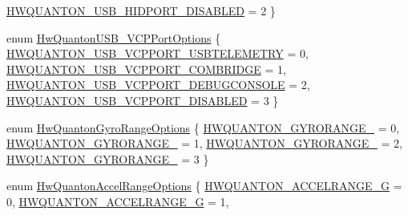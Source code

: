 \begin{DoxyCompactItemize}
\hyperlink{group___hw_quanton_gga6032651edd94cb4e24e1b333c8ea7e64add2cedb1058de19b9363bdf7945debe4}{\-H\-W\-Q\-U\-A\-N\-T\-O\-N\-\_\-\-U\-S\-B\-\_\-\-H\-I\-D\-P\-O\-R\-T\-\_\-\-D\-I\-S\-A\-B\-L\-E\-D} = 2
 \}
\item 
enum \hyperlink{group___hw_quanton_ga05782d1a399ec1fbbc22b0953b1e6907}{\-Hw\-Quanton\-U\-S\-B\-\_\-\-V\-C\-P\-Port\-Options} \{ \hyperlink{group___hw_quanton_gga05782d1a399ec1fbbc22b0953b1e6907acdd9d7e986b523669b41605c0aaefb8a}{\-H\-W\-Q\-U\-A\-N\-T\-O\-N\-\_\-\-U\-S\-B\-\_\-\-V\-C\-P\-P\-O\-R\-T\-\_\-\-U\-S\-B\-T\-E\-L\-E\-M\-E\-T\-R\-Y} = 0, 
\hyperlink{group___hw_quanton_gga05782d1a399ec1fbbc22b0953b1e6907af5abd6567dde92ff1171216f05372cd1}{\-H\-W\-Q\-U\-A\-N\-T\-O\-N\-\_\-\-U\-S\-B\-\_\-\-V\-C\-P\-P\-O\-R\-T\-\_\-\-C\-O\-M\-B\-R\-I\-D\-G\-E} = 1, 
\hyperlink{group___hw_quanton_gga05782d1a399ec1fbbc22b0953b1e6907a9b0f36b89c64cda571340814a471a3e3}{\-H\-W\-Q\-U\-A\-N\-T\-O\-N\-\_\-\-U\-S\-B\-\_\-\-V\-C\-P\-P\-O\-R\-T\-\_\-\-D\-E\-B\-U\-G\-C\-O\-N\-S\-O\-L\-E} = 2, 
\hyperlink{group___hw_quanton_gga05782d1a399ec1fbbc22b0953b1e6907a3255b252ec44cfba3f63edef3956b3a7}{\-H\-W\-Q\-U\-A\-N\-T\-O\-N\-\_\-\-U\-S\-B\-\_\-\-V\-C\-P\-P\-O\-R\-T\-\_\-\-D\-I\-S\-A\-B\-L\-E\-D} = 3
 \}
\item 
enum \hyperlink{group___hw_quanton_ga542a833704bfb4104cb818361c65fa8d}{\-Hw\-Quanton\-Gyro\-Range\-Options} \{ \hyperlink{group___hw_quanton_gga542a833704bfb4104cb818361c65fa8da2673ba44b5fec37bfb2c03cbbdd580a7}{\-H\-W\-Q\-U\-A\-N\-T\-O\-N\-\_\-\-G\-Y\-R\-O\-R\-A\-N\-G\-E\-\_} = 0, 
\hyperlink{group___hw_quanton_gga542a833704bfb4104cb818361c65fa8dae1d40bf489a28856d6e74252988cdbdb}{\-H\-W\-Q\-U\-A\-N\-T\-O\-N\-\_\-\-G\-Y\-R\-O\-R\-A\-N\-G\-E\-\_} = 1, 
\hyperlink{group___hw_quanton_gga542a833704bfb4104cb818361c65fa8daeb0a98fa972ed0d997431994183cd356}{\-H\-W\-Q\-U\-A\-N\-T\-O\-N\-\_\-\-G\-Y\-R\-O\-R\-A\-N\-G\-E\-\_} = 2, 
\hyperlink{group___hw_quanton_gga542a833704bfb4104cb818361c65fa8dab545e0ab0eb596c5ec75a766421753e8}{\-H\-W\-Q\-U\-A\-N\-T\-O\-N\-\_\-\-G\-Y\-R\-O\-R\-A\-N\-G\-E\-\_} = 3
 \}
\item 
enum \hyperlink{group___hw_quanton_gaf4114a991584fabf509a8bcfecfc8904}{\-Hw\-Quanton\-Accel\-Range\-Options} \{ \hyperlink{group___hw_quanton_ggaf4114a991584fabf509a8bcfecfc8904a3d95169a1e5452db07999c61f4169da8}{\-H\-W\-Q\-U\-A\-N\-T\-O\-N\-\_\-\-A\-C\-C\-E\-L\-R\-A\-N\-G\-E\-\_\-G} = 0, 
\hyperlink{group___hw_quanton_ggaf4114a991584fabf509a8bcfecfc8904a043bd42e46e731ad9e79efa550755d10}{\-H\-W\-Q\-U\-A\-N\-T\-O\-N\-\_\-\-A\-C\-C\-E\-L\-R\-A\-N\-G\-E\-\_\-G} = 1, 

\end{DoxyCompactItemize}
